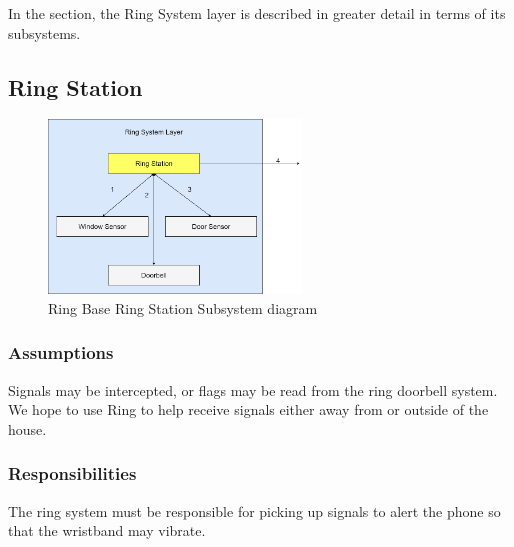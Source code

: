 In the section, the Ring System layer is described in greater detail in terms of its subsystems.

\subsection{Ring Station}

\begin{figure}[h!]
	\centering
 	\includegraphics[width=0.60\textwidth]{images/RingLayer.drawio1.png}
 \caption{Ring Base Ring Station Subsystem diagram}
\end{figure}

\subsubsection{Assumptions}
Signals may be intercepted, or flags may be read from the ring doorbell system. We hope to use Ring to help receive signals either away from or outside of the house.

\subsubsection{Responsibilities}
The ring system must be responsible for picking up signals to alert the phone so that the wristband may vibrate.


